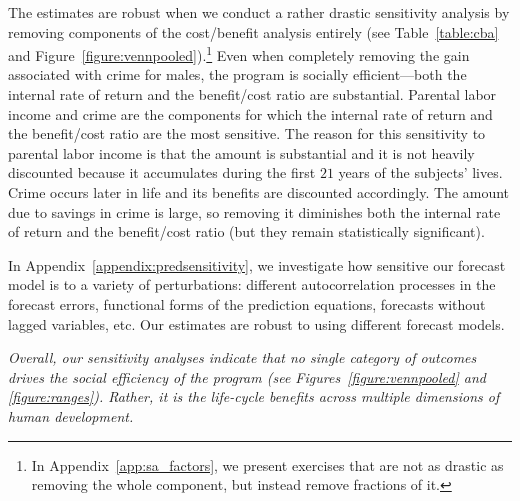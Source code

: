 The estimates are robust when we conduct a rather drastic sensitivity analysis by removing components of the cost/benefit analysis entirely (see Table~\ref{table:cba} and Figure~\ref{figure:vennpooled}).\footnote{In  Appendix~\ref{app:sa_factors}, we present exercises that are not as drastic as removing the whole component, but instead remove fractions of it.} Even when completely removing the gain associated with crime for males, the program is socially efficient---both the internal rate of return and the benefit/cost ratio are substantial. Parental labor income and crime are the components for which the internal rate of return and the benefit/cost ratio are the most sensitive. The reason for this sensitivity to parental labor income is that the amount is substantial and it is not heavily discounted because it accumulates during the first $21$ years of the subjects' lives. Crime occurs later in life and its benefits are discounted accordingly. The amount due to savings in crime is large, so removing it diminishes both the internal rate of return and the benefit/cost ratio (but they remain statistically significant).

In  Appendix~\ref{appendix:predsensitivity}, we investigate how sensitive our forecast model is to a variety of perturbations: different autocorrelation processes in the forecast errors, functional forms of the prediction equations, forecasts without lagged variables, etc. Our estimates are robust to using different forecast models.

\textit{Overall, our sensitivity analyses indicate that no single category of outcomes drives the social efficiency of the program (see Figures~\ref{figure:vennpooled} and \ref{figure:ranges}). Rather, it is the life-cycle benefits across multiple dimensions of human development.}


